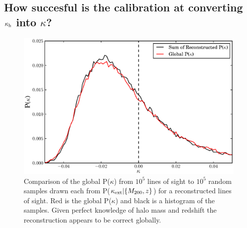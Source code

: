 \documentclass[useAMS,usenatbib]{mn2e}
\begin{document}


\subsection{How succesful is the calibration at converting $\kappa_{\rm h}$ into $\kappa$?}

\begin{figure}
\includegraphics[width=\columnwidth]{figs/globaldist.eps}
\caption[magcut]{Comparison of the global P($\kappa$) from $10^{5}$ lines of sight to $10^{5}$ random samples drawn each from P($\kappa_{\rm ext}|\{M_{200},z\}$) for a reconstructed lines of sight. Red is the global P($\kappa$) and black is a histogram of the samples. Given perfect knowledge of halo mass and redshift the reconstruction appears to be correct globally.}
\label{fig:globaldist}
\end{figure}
\end{document}
